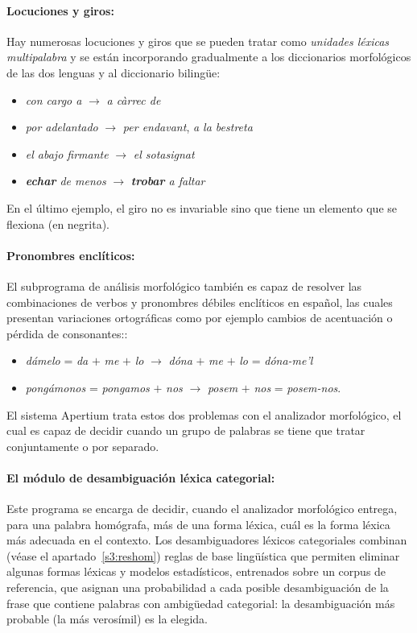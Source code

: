 {\paragraph{Locuciones y giros:} Hay numerosas locuciones y giros que se pueden tratar como \emph{unidades léxicas multipalabra} y se están incorporando gradualmente a los diccionarios morfológicos de las dos lenguas y al diccionario bilingüe: \begin{itemize} \item \emph{con cargo a} $\rightarrow$ \emph{a càrrec de} \item \emph{por adelantado} $\rightarrow$ \emph{per endavant}, \emph{a la bestreta} \item \emph{el abajo firmante} $\rightarrow$ \emph{el sotasignat} \item \emph{{\bf echar} de menos} $\rightarrow$ \emph{{\bf trobar} a faltar}  \end{itemize} En el último ejemplo, el giro no es invariable sino que tiene un elemento que se flexiona (en negrita). 

\paragraph{Pronombres enclíticos:} El subprograma de análisis morfológico también es capaz de resolver las combinaciones de verbos y pronombres débiles enclíticos en español, las cuales presentan variaciones ortográficas como por ejemplo cambios de acentuación o pérdida de consonantes:: \begin{itemize} \item \emph{d\'{a}melo} = \emph{da} $+$ \emph{me} $+$ \emph{lo} $\rightarrow$ \emph{dóna} $+$ \emph{me} $+$ \emph{lo} = \emph{dóna-me'l} \item \emph{pong\'{a}monos} = \emph{pongamos} $+$ \emph{nos} $\rightarrow$ {\em posem} $+$ \emph{nos} = \emph{posem-nos}. \end{itemize} 

El sistema Apertium trata estos dos problemas con el analizador morfológico, el cual es capaz de decidir cuando un grupo de palabras se tiene que tratar conjuntamente o por separado. 

\paragraph{El módulo de desambiguación léxica categorial:} Este programa se encarga de decidir, cuando el analizador morfológico entrega, para una palabra homógrafa, más de una forma léxica, cuál es la forma léxica más adecuada en el contexto. Los desambiguadores léxicos categoriales combinan (véase el apartado~\ref{s3:reshom}) reglas de base lingüística que permiten eliminar algunas formas léxicas y modelos estadísticos, entrenados sobre un corpus de referencia, que asignan una probabilidad a cada posible desambiguación de la frase que contiene palabras con ambigüedad categorial: la desambiguación más probable (la más verosímil) es la elegida. 

}
